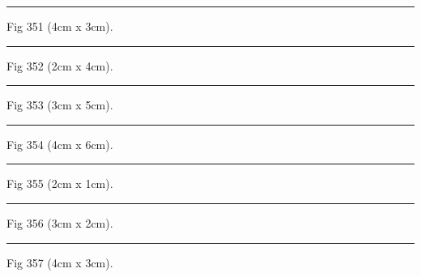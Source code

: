 \documentclass[a4paper,11pt]{article}
\begin{document}
\begin{swarmwrap}%
  \begin{minipage}[t]{4cm}
    \centering
    \rule{\linewidth}{3cm}
    {\footnotesize Fig 351 (4cm x 3cm).}
  \end{minipage}%
\end{swarmwrap}%
\swarmwrapnext
\lipsum[51]%

\begin{swarmwrap}%
  \begin{minipage}[t]{2cm}
    \centering
    \rule{\linewidth}{4cm}
    {\footnotesize Fig 352 (2cm x 4cm).}
  \end{minipage}%
\end{swarmwrap}%
\swarmwrapnext
\lipsum[52]%

\begin{swarmwrap}%
  \begin{minipage}[t]{3cm}
    \centering
    \rule{\linewidth}{5cm}
    {\footnotesize Fig 353 (3cm x 5cm).}
  \end{minipage}%
\end{swarmwrap}%
\swarmwrapnext
\lipsum[53]%

\begin{swarmwrap}%
  \begin{minipage}[t]{4cm}
    \centering
    \rule{\linewidth}{6cm}
    {\footnotesize Fig 354 (4cm x 6cm).}
  \end{minipage}%
\end{swarmwrap}%
\swarmwrapnext
\lipsum[54]%

\begin{swarmwrap}%
  \begin{minipage}[t]{2cm}
    \centering
    \rule{\linewidth}{1cm}
    {\footnotesize Fig 355 (2cm x 1cm).}
  \end{minipage}%
\end{swarmwrap}%
\swarmwrapnext
\lipsum[55]%

\begin{swarmwrap}%
  \begin{minipage}[t]{3cm}
    \centering
    \rule{\linewidth}{2cm}
    {\footnotesize Fig 356 (3cm x 2cm).}
  \end{minipage}%
\end{swarmwrap}%
\swarmwrapnext
\lipsum[56]%

\begin{swarmwrap}%
  \begin{minipage}[t]{4cm}
    \centering
    \rule{\linewidth}{3cm}
    {\footnotesize Fig 357 (4cm x 3cm).}
  \end{minipage}%
\end{swarmwrap}%
\swarmwrapnext
\lipsum[57]%
\end{document}
